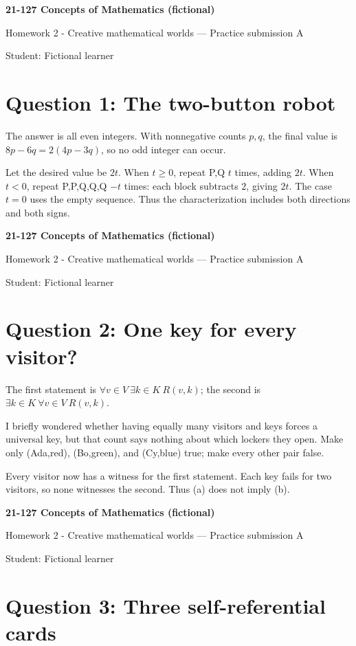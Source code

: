 \documentclass[11pt]{article}
\begin{document}
\textbf{21-127 Concepts of Mathematics (fictional)}

Homework 2 - Creative mathematical worlds --- Practice submission A

Student: Fictional learner

\section*{Question 1: The two-button robot}

The answer is all even integers. With nonnegative counts $p,q$, the final value is $8p-6q=2(4p-3q)$, so no odd integer can occur.

Let the desired value be $2t$. When $t\geq0$, repeat P,Q $t$ times, adding $2t$. When $t<0$, repeat P,P,Q,Q,Q $-t$ times: each block subtracts $2$, giving $2t$. The case $t=0$ uses the empty sequence. Thus the characterization includes both directions and both signs.

\newpage
\textbf{21-127 Concepts of Mathematics (fictional)}

Homework 2 - Creative mathematical worlds --- Practice submission A

Student: Fictional learner

\section*{Question 2: One key for every visitor?}

The first statement is $\forall v\in V\ \exists k\in K\ R(v,k)$; the second is $\exists k\in K\ \forall v\in V\ R(v,k)$.

I briefly wondered whether having equally many visitors and keys forces a universal key, but that count says nothing about which lockers they open. Make only (Ada,red), (Bo,green), and (Cy,blue) true; make every other pair false.

Every visitor now has a witness for the first statement. Each key fails for two visitors, so none witnesses the second. Thus (a) does not imply (b).

\newpage
\textbf{21-127 Concepts of Mathematics (fictional)}

Homework 2 - Creative mathematical worlds --- Practice submission A

Student: Fictional learner

\section*{Question 3: Three self-referential cards}
\end{document}
